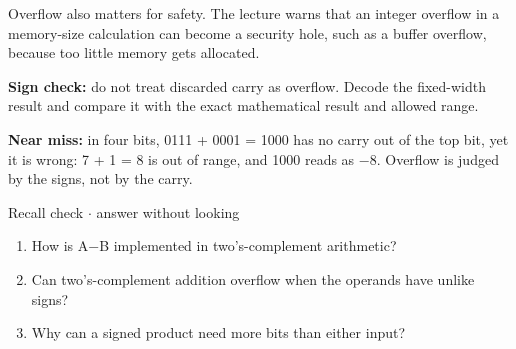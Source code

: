 \documentclass[11pt]{article}
\begin{document}
\begin{keepsection}
\begin{keepsection}
Overflow also matters for safety. The lecture warns that an integer overflow in a memory-size calculation can become a security hole, such as a buffer overflow, because too little memory gets allocated.

\begin{notebox}\textbf{Sign check:} do not treat discarded carry as overflow. Decode the fixed-width result and compare it with the exact mathematical result and allowed range.\end{notebox}

\begin{notebox}\textbf{Near miss:} in four bits, 0111 + 0001 = 1000 has no carry out of the top bit, yet it is wrong: 7 + 1 = 8 is out of range, and 1000 reads as \ensuremath{-}8. Overflow is judged by the signs, not by the carry.\end{notebox}

\begin{recallbox}{Recall check \ensuremath{\cdot} answer without looking}
\begin{enumerate}
\item How is A\ensuremath{-}B implemented in two’s-complement arithmetic?
\item Can two’s-complement addition overflow when the operands have unlike signs?
\item Why can a signed product need more bits than either input?
\end{enumerate}

\end{recallbox}
\end{keepsection}
\end{keepsection}
\end{document}
